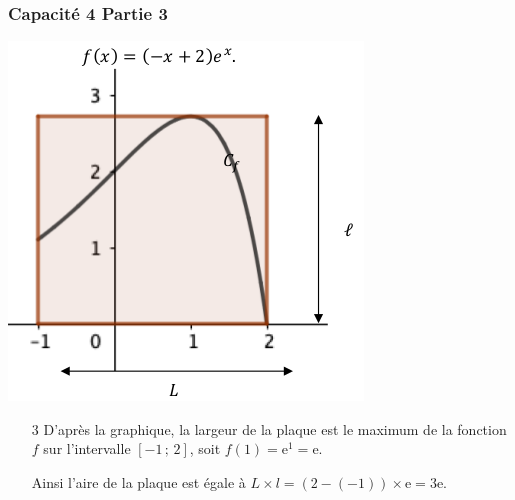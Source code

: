 \documentclass[11pt, hyperref={urlcolor=red,%
            linkcolor=blue, %
            colorlinks=true}]{beamer}
\newcommand{\Interff}[2]{\left[#1\, ;\, #2\right]}
\begin{document}
\begin{frame}
\frametitle{Capacité 4 Partie 3}

\begin{center}
\includegraphics[scale=0.3]{capacite4.png}
\end{center}

\begin{enumerate}

	
\item[3] D'après la graphique, la largeur de la plaque est le maximum de la fonction $f$ sur l'intervalle $\Interff{-1}{2}$, soit  $f(1)=\text{e}^{1}=\text{e}$.

Ainsi l'aire de la plaque est égale à $L \times l = (2 - (-1))\times \text{e}=3\text{e}$.
\end{enumerate}
\end{frame}
\end{document}
